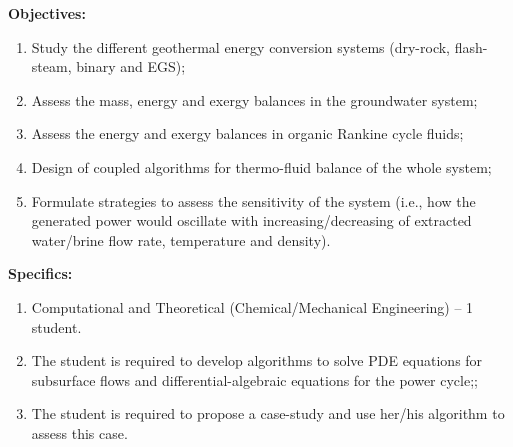 \documentclass[12pts,a4paper,amsmath,amssymb,floatfix]{article}%
\begin{document}
\begin{enumerate}[label=\bfseries Project \arabic*:]
\noindent
{\bf Objectives:}
\begin{enumerate}
\item Study the different geothermal energy conversion systems (dry-rock, flash-steam, binary and EGS);
\item Assess the mass, energy and exergy balances in the groundwater system;
\item Assess the energy and exergy balances in organic Rankine cycle fluids;
\item Design of coupled algorithms for thermo-fluid balance of the whole system;
\item Formulate strategies to assess the sensitivity of the system (i.e., how the generated power would oscillate with increasing/decreasing of extracted water/brine flow rate, temperature and density). 
\end{enumerate}

\noindent
{\bf Specifics:} 
\begin{enumerate}
\item Computational and Theoretical (Chemical/Mechanical Engineering) -- 1 student.
\item The student is required to develop algorithms to solve PDE equations for subsurface flows and differential-algebraic equations for the power cycle;;
\item The student is required to propose a case-study and use her/his algorithm to assess this case.
\end{enumerate}


\end{enumerate}
\end{document}
